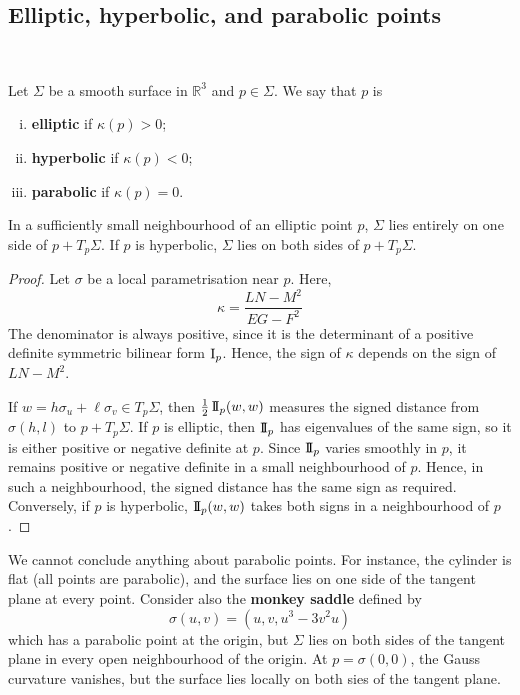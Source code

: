 \documentclass[a4paper]{article}
\begin{document}
\subsection{Elliptic, hyperbolic, and parabolic points}
\ \vspace*{-1.5em}
\begin{definition}
	Let \( \Sigma \) be a smooth surface in \( \mathbb R^3 \) and \( p \in \Sigma \).
	We say that \( p \) is
	\begin{enumerate}[(i)]
		\item \textbf{elliptic} if \( \kappa(p) > 0 \);
		\item \textbf{hyperbolic} if \( \kappa(p) < 0 \);
		\item \textbf{parabolic} if \( \kappa(p) = 0 \).
	\end{enumerate}
\end{definition}
\begin{lemma}
	In a sufficiently small neighbourhood of an elliptic point \( p \), \( \Sigma \) lies entirely on one side of \( p + T_p \Sigma \).
	If \( p \) is hyperbolic, \( \Sigma \) lies on both sides of \( p + T_p \Sigma \).
\end{lemma}
\begin{proof}
	Let \( \sigma \) be a local parametrisation near \( p \).
	Here,
	\[
		\kappa = \frac{LN-M^2}{EG-F^2}
	\]
	The denominator is always positive, since it is the determinant of a positive definite symmetric bilinear form \( \operatorname{\mathrm{I}}_p \).
	Hence, the sign of \( \kappa \) depends on the sign of \( LN-M^2 \).

	If \( w = h \sigma_u + \ell \sigma_v \in T_p \Sigma \), then \( \frac{1}{2} \operatorname{\mathrm{I\!I}}_p(w,w) \) measures the signed distance from \( \sigma(h,l) \) to \( p + T_p \Sigma \).
	If \( p \) is elliptic, then \( \operatorname{\mathrm{I\!I}}_p \) has eigenvalues of the same sign, so it is either positive or negative definite at \( p \).
	Since \( \operatorname{\mathrm{I\!I}}_p \) varies smoothly in \( p \), it remains positive or negative definite in a small neighbourhood of \( p \).
	Hence, in such a neighbourhood, the signed distance has the same sign as required.
	Conversely, if \( p \) is hyperbolic, \( \operatorname{\mathrm{I\!I}}_p(w,w) \) takes both signs in a neighbourhood of \( p \).
\end{proof}

\begin{remark}
	We cannot conclude anything about parabolic points.
	For instance, the cylinder is flat (all points are parabolic), and the surface lies on one side of the tangent plane at every point.
	Consider also the \textbf{monkey saddle} defined by
	\[
		\sigma(u,v) = (u,v,u^3 - 3v^2 u)
	\]
	which has a parabolic point at the origin, but \( \Sigma \) lies on both sides of the tangent plane in every open neighbourhood of the origin.
	At \( p = \sigma(0,0) \), the Gauss curvature vanishes, but the surface lies locally on both sies of the tangent plane.
\end{remark}
\end{document}
